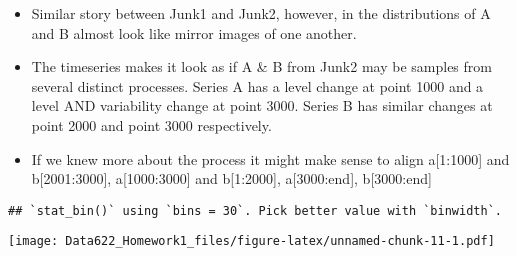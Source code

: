 \documentclass[]{article}
\newenvironment{Shaded}{\begin{snugshade}}{\end{snugshade}}
\newcommand{\KeywordTok}[1]{\textcolor[rgb]{0.13,0.29,0.53}{\textbf{#1}}}
\newcommand{\DataTypeTok}[1]{\textcolor[rgb]{0.13,0.29,0.53}{#1}}
\newcommand{\StringTok}[1]{\textcolor[rgb]{0.31,0.60,0.02}{#1}}
\newcommand{\OperatorTok}[1]{\textcolor[rgb]{0.81,0.36,0.00}{\textbf{#1}}}
\newcommand{\NormalTok}[1]{#1}
\providecommand{\tightlist}{%
  \setlength{\itemsep}{0pt}\setlength{\parskip}{0pt}}
\begin{document}
\begin{itemize}
\tightlist
\item
  Similar story between Junk1 and Junk2, however, in the distributions
  of A and B almost look like mirror images of one another.
\item
  The timeseries makes it look as if A \& B from Junk2 may be samples
  from several distinct processes. Series A has a level change at point
  1000 and a level AND variability change at point 3000. Series B has
  similar changes at point 2000 and point 3000 respectively.
\item
  If we knew more about the process it might make sense to align
  a{[}1:1000{]} and b{[}2001:3000{]}, a{[}1000:3000{]} and
  b{[}1:2000{]}, a{[}3000:end{]}, b{[}3000:end{]}
\end{itemize}

\begin{Shaded}
\end{Shaded}

\begin{verbatim}
## `stat_bin()` using `bins = 30`. Pick better value with `binwidth`.
\end{verbatim}

\texttt{[image: Data622\_Homework1\_files/figure-latex/unnamed-chunk-11-1.pdf]}

\begin{Shaded}
\end{Shaded}
\end{document}
